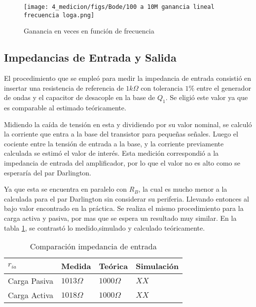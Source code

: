 \begin{figure}[ht]
    \centering
    \texttt{[image: 4\_medicion/figs/Bode/100 a 10M ganancia lineal frecuencia loga.png]}
    \caption{Ganancia en veces en función de frecuencia}\label{fig:ganancia veces funcion frecuencia medido}
\end{figure}



\subsection{Impedancias de Entrada y Salida}

El procedimiento que se empleó para medir la impedancia de entrada consistió en insertar una resistencia de referencia de $1 k\Omega$ con tolerancia $1\%$ entre el generador de ondas y el capacitor de desacople en la base de $Q_1$. Se eligió este valor ya que es comparable al estimado teóricamente.

Midiendo la caída de tensión en esta y dividiendo por su valor nominal, se calculó la corriente que entra a la base del transistor para pequeñas señales. Luego el cociente entre la tensión de entrada a la base, y la corriente previamente calculada se estimó el valor de interés. Esta medición correspondió a la impedancia de entrada del amplificador, por lo que el valor no es alto como se esperaría del par Darlington.

Ya que esta se encuentra en paralelo con $R_B$, la cual es mucho menor a la calculada para el par Darlington sin considerar su periferia. Llevando entonces al bajo valor encontrado en la práctica.
Se realiza el mismo procedimiento para la carga activa y pasiva, por mas que se espera un resultado muy similar. En la tabla \ref{table:Ri comp}, se contrastó lo medido,simulado y calculado teóricamente.

\begin{table}[ht]
    \centering
    \begin{tabular}{|l|l|l|l|}
    \hline
    $r_{ia}$     & Medida       & Teórica         & Simulación \\ \hline
    Carga Pasiva & $1013\Omega$ & $1000\Omega $   &  $XX $          \\ \hline
    Carga Activa & $1018\Omega$ & $1000\Omega $  &  $XX $          \\ \hline
    \end{tabular}
    \caption{Comparación impedancia de entrada}\label{table:Ri comp}
\end{table}

